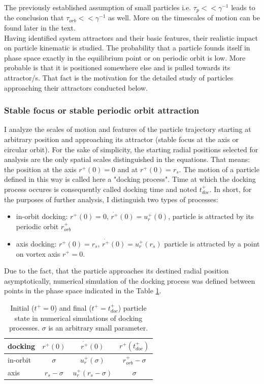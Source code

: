 \documentclass[../main.tex]{subfiles}
\begin{document}
The previously established assumption of small particles  i.e. $\tau_p<<\gamma^{-1}$ leads to the conclusion that $\tau_{orb}<<\gamma^{-1}$ as well. More on the timescales of motion can be found later in the text.\\
Having identified system attractors and their basic features, their realistic impact on particle kinematic is studied. The probability that a particle founds itself in phase space exactly in the equilibrium point or on periodic orbit is low. More probable is that it is positioned somewhere else and is pulled towards its attractor/s. That fact is the motivation for the detailed study of particles approaching their attractors conducted below.\\

\subsubsection{Stable focus or stable periodic orbit attraction}
I analyze the scales of motion and features of the particle trajectory starting at arbitrary position and approaching its attractor (stable focus at the axis or circular orbit). For the sake of simplicity, the starting radial positions selected for analysis are the only spatial scales distinguished in the equations. That means: the position at the axis $r^+(0)=0$ and at $r^+(0)=r_s$. The motion of a particle defined in this way is called here a "docking process". Time at which the docking process occures is consequently called docking time and noted $t^+_{doc}$. In short, for the purposes of further analysis, I distinguish two types of processes:
\begin{itemize}
\item in-orbit docking: $r^+(0)=0$, $\dot{r^+}(0)=u_r^+(0)$, particle is attracted by its periodic orbit $r^+_{orb}$
\item axis docking: $r^+(0)=r_s$, $\dot{r^+}(0)=u_r^+(r_s)$ particle is attracted by a point on vortex axis $r^+=0$.
\end{itemize}
Due to the fact, that the particle approaches its destined radial position asymptotically, numerical simulation of the docking process was defined between points in the phase space indicated in the Table \ref{tab:ch3_1}.

\begin{table}
\small
\tabcolsep=0.2cm
\centering
\caption{Initial ($t^+=0$) and final ($t^+=t^+_{doc}$) particle state in numerical simulations of docking processes. $\sigma$ is an arbitrary small parameter.}
\centering
\begin{tabular}{|l||c|c|c|}
\hline 
docking& $r^+(0)$ & $\dot{r^+}(0)$ & $r^+(t^+_{doc})$\\
\hline \hline
in-orbit & $\sigma$ & $u^+_r(\sigma)$ & $r^+_{orb}-\sigma$\\
\hline
axis & $r_s-\sigma$ & $u_r^+(r_s-\sigma)$ & $\sigma$\\
\hline
\end{tabular}
\label{tab:ch3_1}
\end{table}
\end{document}
